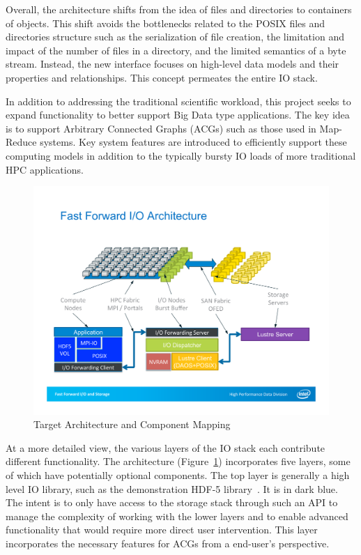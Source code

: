 \documentclass[conference]{IEEEtran}
\begin{document}
Overall, the architecture shifts from the idea of files and directories to
containers of objects. This shift avoids the bottlenecks related to the POSIX
files and directories structure such as the serialization of file creation, the
limitation and impact of the number of files in a directory, and the limited
semantics of a byte stream. Instead, the new interface focuses on high-level
data models and their properties and relationships. This concept permeates the
entire IO stack.

In addition to addressing the traditional scientific workload, this project
seeks to expand functionality to better support Big Data type applications. The
key idea is to support Arbitrary Connected Graphs (ACGs) such as those used in
Map-Reduce systems. Key system features are introduced to efficiently support
these computing models in addition to the typically bursty IO loads of more
traditional HPC applications.

\begin{figure}[htbp]
\centering
\includegraphics[width=\columnwidth]{images/arch-mapping}
\caption{Target Architecture and Component Mapping}
\label{fig:arch-mapping}
\end{figure}

At a more detailed view, the various layers of the IO stack each contribute
different functionality.  The architecture (Figure~\ref{fig:arch-mapping})
incorporates five layers, some of which have potentially optional components.
The top layer is generally a high level IO library, such as the demonstration
HDF-5 library~\cite{hdf5}. It is in dark blue. The intent is to only have
access to the storage stack through such an API to manage the complexity of
working with the lower layers and to enable advanced functionality that would
require more direct user intervention. This layer incorporates the necessary
features for ACGs from a end-user's perspective.
\end{document}
